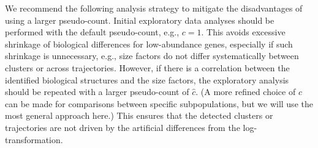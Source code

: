 \documentclass[10pt,letterpaper]{article}
\begin{document}
We recommend the following analysis strategy to mitigate the disadvantages of using a larger pseudo-count.
Initial exploratory data analyses should be performed with the default pseudo-count, e.g., $c=1$.
This avoids excessive shrinkage of biological differences for low-abundance genes, especially if such shrinkage is unnecessary, 
e.g., size factors do not differ systematically between clusters or across trajectories.
However, if there is a correlation between the identified biological structures and the size factors, the exploratory analysis should be repeated with a larger pseudo-count of $\hat c$. 
(A more refined choice of $c$ can be made for comparisons between specific subpopulations, but we will use the most general approach here.)
This ensures that the detected clusters or trajectories are not driven by the artificial differences from the log-transformation.



\end{document}
